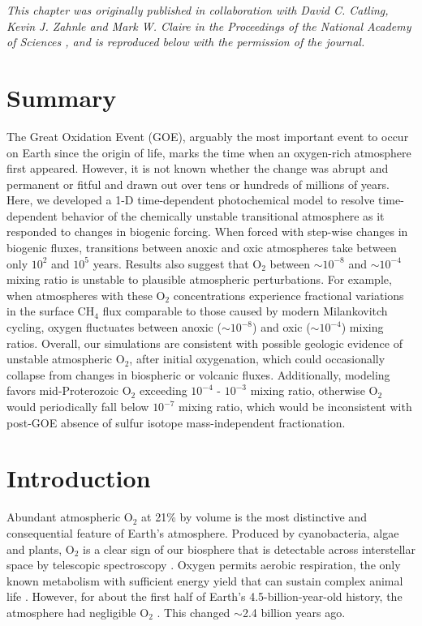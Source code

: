 
\noindent \textit{This chapter was originally published in collaboration with David C. Catling, Kevin J. Zahnle and Mark W. Claire in the Proceedings of the National Academy of Sciences \citep{Wogan_2022}, and is reproduced below with the permission of the journal.}

\section*{\centering Summary}

The Great Oxidation Event (GOE), arguably the most important event to occur on Earth since the origin of life, marks the time when an oxygen-rich atmosphere first appeared. However, it is not known whether the change was abrupt and permanent or fitful and drawn out over tens or hundreds of millions of years. Here, we developed a 1-D time-dependent photochemical model to resolve time-dependent behavior of the chemically unstable transitional atmosphere as it responded to changes in biogenic forcing. When forced with step-wise changes in biogenic fluxes, transitions between anoxic and oxic atmospheres take between only $10^2$ and $10^5$ years. Results also suggest that O$_2$ between $\sim10^{-8}$ and $\sim10^{-4}$ mixing ratio is unstable to plausible atmospheric perturbations. For example, when atmospheres with these O$_2$ concentrations experience fractional variations in the surface CH$_4$ flux comparable to those caused by modern Milankovitch cycling, oxygen fluctuates between anoxic ($\sim10^{-8}$) and oxic ($\sim10^{-4}$) mixing ratios. Overall, our simulations are consistent with possible geologic evidence of unstable atmospheric O$_2$, after initial oxygenation, which could occasionally collapse from changes in biospheric or volcanic fluxes. Additionally, modeling favors mid-Proterozoic O$_2$ exceeding $10^{-4}$ - $10^{-3}$ mixing ratio, otherwise O$_2$ would periodically fall below $10^{-7}$ mixing ratio, which would be inconsistent with post-GOE absence of sulfur isotope mass-independent fractionation.

\section{Introduction}

Abundant atmospheric O$_2$ at 21\% by volume is the most distinctive and consequential feature of Earth's atmosphere. Produced by cyanobacteria, algae and plants, O$_2$ is a clear sign of our biosphere that is detectable across interstellar space by telescopic spectroscopy \citep{Meadows_2018}. Oxygen permits aerobic respiration, the only known metabolism  with sufficient energy yield that can sustain complex animal life \citep{Catling_2005}. However, for about the first half of Earth's 4.5-billion-year-old history, the atmosphere had negligible O$_2$ \citep[e.g.][]{Catling_2020}. This changed $\sim$2.4 billion years ago.

